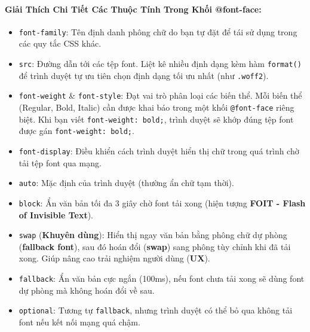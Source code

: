 \documentclass[11pt,oneside]{book}
\newcommand{\codeinline}[1]{\textcolor{accentOrange}{\texttt{#1}}}
\newcommand{\term}[1]{\textbf{\textcolor{primaryBlue}{#1}}}
\begin{document}
\paragraph{Giải Thích Chi Tiết Các Thuộc Tính Trong Khối @font-face:}
\begin{itemize}[leftmargin=1.5em, itemsep=3pt, parsep=0pt]
    \item \codeinline{font-family}: Tên định danh phông chữ do bạn tự đặt để tái sử dụng trong các quy tắc CSS khác.
    \item \codeinline{src}: Đường dẫn tới các tệp font. Liệt kê nhiều định dạng kèm hàm \codeinline{format()} để trình duyệt tự ưu tiên chọn định dạng tối ưu nhất (như \codeinline{.woff2}).
    \item \codeinline{font-weight} \& \codeinline{font-style}: Đạt vai trò phân loại các biến thể. Mỗi biến thể (Regular, Bold, Italic) cần được khai báo trong một khối \codeinline{@font-face} riêng biệt. Khi bạn viết \codeinline{font-weight: bold;}, trình duyệt sẽ khớp đúng tệp font được gán \codeinline{font-weight: bold;}.
    \item \codeinline{font-display}: Điều khiển cách trình duyệt hiển thị chữ trong quá trình chờ tải tệp font qua mạng.
\end{itemize}

\begin{conceptBox}
\begin{itemize}[leftmargin=1.5em, itemsep=3pt, parsep=0pt]
    \item \codeinline{auto}: Mặc định của trình duyệt (thường ẩn chữ tạm thời).
    \item \codeinline{block}: Ẩn văn bản tối đa 3 giây chờ font tải xong (hiện tượng \term{FOIT - Flash of Invisible Text}).
    \item \codeinline{swap} (\textbf{Khuyên dùng}): Hiển thị ngay văn bản bằng phông chữ dự phòng (\term{fallback font}), sau đó hoán đổi (\term{swap}) sang phông tùy chỉnh khi đã tải xong. Giúp nâng cao trải nghiệm người dùng (\term{UX}).
    \item \codeinline{fallback}: Ẩn văn bản cực ngắn (100ms), nếu font chưa tải xong sẽ dùng font dự phòng mà không hoán đổi về sau.
    \item \codeinline{optional}: Tương tự \codeinline{fallback}, nhưng trình duyệt có thể bỏ qua không tải font nếu kết nối mạng quá chậm.
\end{itemize}
\end{conceptBox}
\end{document}
